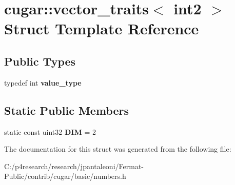 \hypertarget{structcugar_1_1vector__traits_3_01int2_01_4}{}\section{cugar\+:\+:vector\+\_\+traits$<$ int2 $>$ Struct Template Reference}
\label{structcugar_1_1vector__traits_3_01int2_01_4}
\subsection*{Public Types}
\begin{DoxyCompactItemize}
\item 
\mbox{\label{structcugar_1_1vector__traits_3_01int2_01_4_a6224aab9d791ea2ee96c1d7a523d8676}} 
typedef int {\bfseries value\+\_\+type}
\end{DoxyCompactItemize}
\subsection*{Static Public Members}
\begin{DoxyCompactItemize}
\item 
\mbox{\label{structcugar_1_1vector__traits_3_01int2_01_4_a693864cce8161fe0947cae9fd06ebe84}} 
static const uint32 {\bfseries D\+IM} = 2
\end{DoxyCompactItemize}


The documentation for this struct was generated from the following file\+:\begin{DoxyCompactItemize}
\item 
C\+:/p4research/research/jpantaleoni/\+Fermat-\/\+Public/contrib/cugar/basic/numbers.\+h\end{DoxyCompactItemize}

